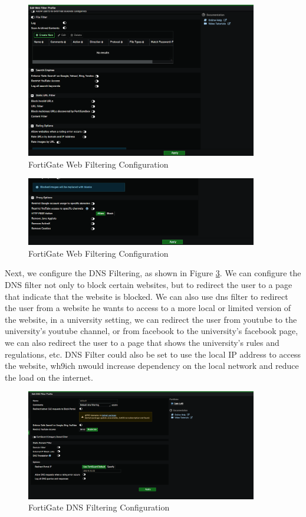\documentclass[12pt]{report}
\begin{document}
\begin{figure}
    \centering
    \includegraphics[width=0.9\textwidth]{images/Implementation/wf2.png}
    \caption{FortiGate Web Filtering Configuration}
    \label{fig:wf2}
\end{figure}
\begin{figure}
    \centering
    \includegraphics[width=0.9\textwidth]{images/Implementation/wf3.png}
    \caption{FortiGate Web Filtering Configuration}
    \label{fig:wf3}
\end{figure}
Next, we configure the DNS Filtering, as shown in Figure \ref{fig:dnsf}. We can configure the DNS filter not only to block certain websites, but to redirect the user to a page that indicate that the website is blocked. We can also use dns filter to redirect the user from a website he wants to access to a more local or limited version of the website, in a university setting, we can redirect the user from youtube to the university's youtube channel, or from facebook to the university's facebook page, we can also redirect the user to a page that shows the university's rules and regulations, etc. DNS Filter could also be set to use the local IP address to access the website, wh9ich nwould increase dependency on the local network and reduce the load on the internet.
\begin{figure}
    \centering
    \includegraphics[width=0.9\textwidth]{images/Implementation/dnsf.png}
    \caption{FortiGate DNS Filtering Configuration}
    \label{fig:dnsf}
\end{figure}
\end{document}
